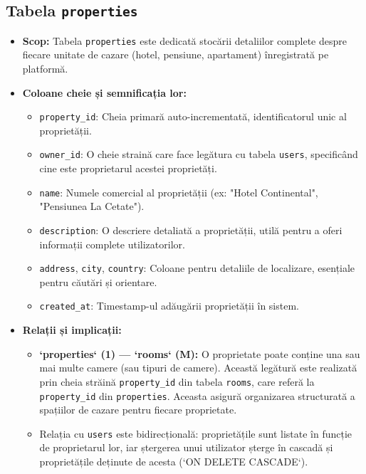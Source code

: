 \documentclass[12pt, a4paper, oneside, romanian]{teza-upb}
\begin{document}
\subsection{Tabela \texttt{properties}}
\begin{itemize}
	\item \textbf{Scop:} Tabela \texttt{properties} este dedicată stocării detaliilor complete despre fiecare unitate de cazare (hotel, pensiune, apartament) înregistrată pe platformă.
	\item \textbf{Coloane cheie și semnificația lor:}
	\begin{itemize}
		\item \texttt{property\_id}: Cheia primară auto-incrementată, identificatorul unic al proprietății.
		\item \texttt{owner\_id}: O cheie straină care face legătura cu tabela \texttt{users}, specificând cine este proprietarul acestei proprietăți.
		\item \texttt{name}: Numele comercial al proprietății (ex: "Hotel Continental", "Pensiunea La Cetate").
		\item \texttt{description}: O descriere detaliată a proprietății, utilă pentru a oferi informații complete utilizatorilor.
		\item \texttt{address}, \texttt{city}, \texttt{country}: Coloane pentru detaliile de localizare, esențiale pentru căutări și orientare.
		\item \texttt{created\_at}: Timestamp-ul adăugării proprietății în sistem.
	\end{itemize}
	\item \textbf{Relații și implicații:}
	\begin{itemize}
		\item \textbf{`properties` (1) --- `rooms` (M):} O proprietate poate conține una sau mai multe camere (sau tipuri de camere). Această legătură este realizată prin cheia străină \texttt{property\_id} din tabela \texttt{rooms}, care referă la \texttt{property\_id} din \texttt{properties}. Aceasta asigură organizarea structurată a spațiilor de cazare pentru fiecare proprietate.
		\item Relația cu \texttt{users} este bidirecțională: proprietățile sunt listate în funcție de proprietarul lor, iar ștergerea unui utilizator șterge în cascadă și proprietățile deținute de acesta (`ON DELETE CASCADE`).
	\end{itemize}
\end{itemize}
\end{document}
